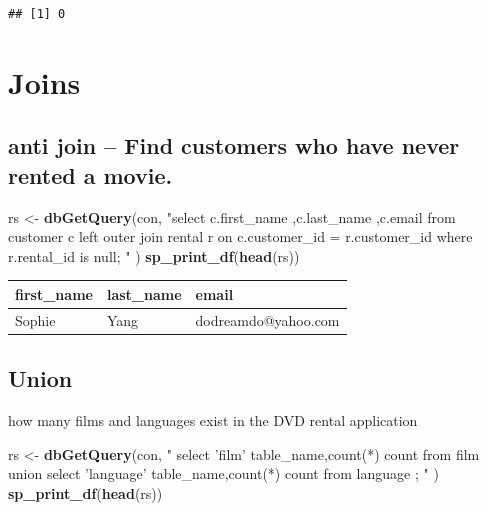 \documentclass[]{book}
\newenvironment{Shaded}{\begin{snugshade}}{\end{snugshade}}
\newcommand{\KeywordTok}[1]{\textcolor[rgb]{0.13,0.29,0.53}{\textbf{#1}}}
\newcommand{\NormalTok}[1]{#1}
\newcommand{\StringTok}[1]{\textcolor[rgb]{0.31,0.60,0.02}{#1}}
\theoremstyle{definition}
\theoremstyle{definition}
\theoremstyle{definition}
\theoremstyle{remark}
\begin{document}
\begin{verbatim}
## [1] 0
\end{verbatim}

\hypertarget{joins}{%
\section{Joins}\label{joins}}

\hypertarget{anti-join-find-customers-who-have-never-rented-a-movie.}{%
\subsection{anti join -- Find customers who have never rented a
movie.}\label{anti-join-find-customers-who-have-never-rented-a-movie.}}

\begin{Shaded}
\begin{Highlighting}[]
\NormalTok{rs <-}\StringTok{ }\KeywordTok{dbGetQuery}\NormalTok{(con,}
                 \StringTok{"select c.first_name}
\StringTok{                        ,c.last_name}
\StringTok{                        ,c.email}
\StringTok{                    from customer c }
\StringTok{                         left outer join rental r}
\StringTok{                              on c.customer_id = r.customer_id }
\StringTok{                   where r.rental_id is null;}
\StringTok{                 "}
\NormalTok{                 )}
\KeywordTok{sp_print_df}\NormalTok{(}\KeywordTok{head}\NormalTok{(rs))}
\end{Highlighting}
\end{Shaded}

\begin{tabular}{l|l|l}
\hline
first\_name & last\_name & email\\
\hline
Sophie & Yang & dodreamdo@yahoo.com\\
\hline
\end{tabular}

\hypertarget{union}{%
\subsection{Union}\label{union}}

how many films and languages exist in the DVD rental application

\begin{Shaded}
\begin{Highlighting}[]
\NormalTok{rs <-}\StringTok{ }\KeywordTok{dbGetQuery}\NormalTok{(con,}
                \StringTok{"      select 'film' table_name,count(*) count from film }
\StringTok{                 union select 'language' table_name,count(*) count from language }
\StringTok{               ;}
\StringTok{                "}
\NormalTok{                )}
\KeywordTok{sp_print_df}\NormalTok{(}\KeywordTok{head}\NormalTok{(rs))}
\end{Highlighting}
\end{Shaded}
\end{document}
